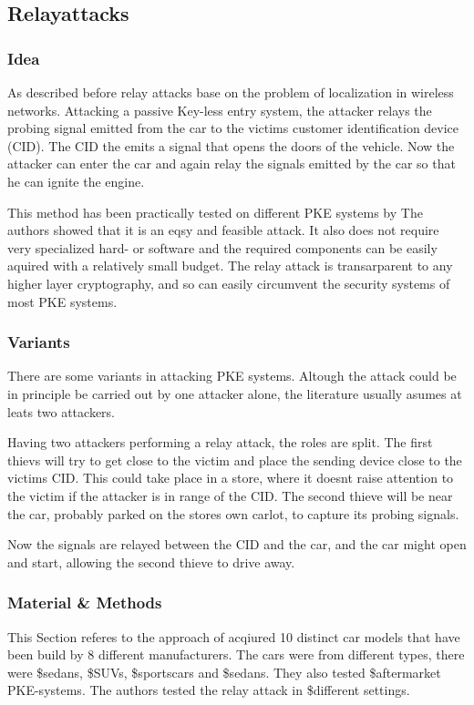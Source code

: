 
\subsection{Relayattacks}
\subsubsection*{Idea}
	As described before relay attacks base on the problem of localization in
	wireless networks.
	Attacking a passive Key-less entry system,
	the attacker relays the probing signal emitted from the car to the victims
	customer identification device (CID).
	The CID the emits a signal that opens the doors of the vehicle.
	Now the attacker can enter the car and again relay the signals emitted by the
	car so that he can ignite the engine.
	
	This method has been practically tested on different PKE systems by %
	The authors showed that it is an eqsy and feasible attack.
	It also does not require very specialized hard- or software and
	the required components can be easily aquired with a relatively small budget.
	The relay attack is transarparent to any higher layer cryptography,	%
	and so can easily circumvent the security systems of most PKE systems.

\subsubsection*{Variants}
	There are some variants in attacking PKE systems.
	Altough the attack could be in principle be carried out by one attacker alone,
	the literature usually asumes at leats two attackers.

	\label{par:twoThies}
	Having two attackers performing a relay attack,
	the roles are split.
	The first thievs will try to get close to the victim and place
	the sending device close to the victims CID.
	This could take place in a store,
	where it doesnt raise attention to the victim if the attacker
	is in range of the CID.
	The second thieve will be near the car,
	probably parked on the stores own carlot,
	to capture its probing signals.

	Now the signals are relayed between the CID and the car,
	and the car might open and start,
	allowing the second thieve to drive away.

\subsubsection*{Material \& Methods}
	This Section referes to the approach of \citeauthor{relayAttacksFranc}
	\citeauthor{relayAttacksFranc} acqiured 10 distinct car models that have been build by 8 different manufacturers.
	The cars were from different types,
	there were \$sedans, \$SUVs, \$sportscars  and \$sedans.
	They also tested \$aftermarket PKE-systems.
	The authors tested the relay attack in \$different settings.

